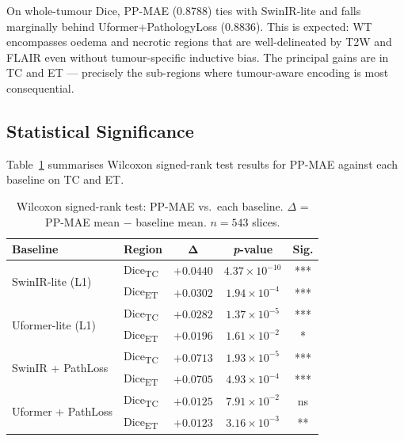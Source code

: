 \documentclass[conference]{IEEEtran}
\begin{document}
On whole-tumour Dice, PP-MAE (0.8788) ties with SwinIR-lite and
falls marginally behind Uformer+PathologyLoss (0.8836). This is
expected: WT encompasses oedema and necrotic regions that are
well-delineated by T2W and FLAIR even without tumour-specific
inductive bias. The principal gains are in TC and ET — precisely
the sub-regions where tumour-aware encoding is most consequential.

\subsection{Statistical Significance}

Table~\ref{tab:significance} summarises Wilcoxon signed-rank
test results for PP-MAE against each baseline on TC and ET.

\begin{table}[t]
  \caption{Wilcoxon signed-rank test: PP-MAE vs.\ each baseline.
    $\Delta$ = PP-MAE mean $-$ baseline mean. $n = 543$ slices.}
  \label{tab:significance}
  \centering
  \renewcommand{\arraystretch}{1.15}
  \begin{tabular}{llccc}
    \toprule
    \textbf{Baseline} & \textbf{Region}
      & $\boldsymbol{\Delta}$
      & \textbf{\textit{p}-value}
      & \textbf{Sig.} \\
    \midrule
    \multirow{2}{*}{SwinIR-lite (L1)}
      & Dice\textsubscript{TC} & $+0.0440$ & $4.37 \times 10^{-10}$ & *** \\
      & Dice\textsubscript{ET} & $+0.0302$ & $1.94 \times 10^{-4}$  & *** \\
    \multirow{2}{*}{Uformer-lite (L1)}
      & Dice\textsubscript{TC} & $+0.0282$ & $1.37 \times 10^{-5}$  & *** \\
      & Dice\textsubscript{ET} & $+0.0196$ & $1.61 \times 10^{-2}$  & *   \\
    \multirow{2}{*}{SwinIR + PathLoss}
      & Dice\textsubscript{TC} & $+0.0713$ & $1.93 \times 10^{-5}$  & *** \\
      & Dice\textsubscript{ET} & $+0.0705$ & $4.93 \times 10^{-4}$  & *** \\
    \multirow{2}{*}{Uformer + PathLoss}
      & Dice\textsubscript{TC} & $+0.0125$ & $7.91 \times 10^{-2}$  & ns  \\
      & Dice\textsubscript{ET} & $+0.0123$ & $3.16 \times 10^{-3}$  & **  \\
    \bottomrule
  \end{tabular}
\end{table}
\end{document}
